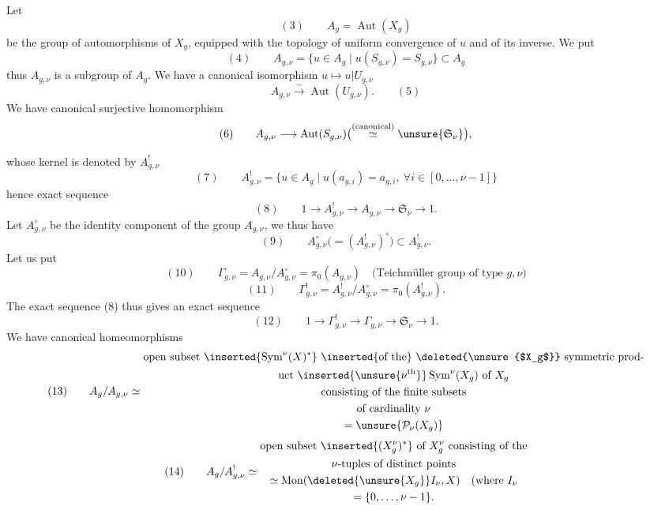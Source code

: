 Let
\[
(3)\qquad A_g=\operatorname{Aut}(X_g)
\]
be the group of automorphisms of $X_g$, equipped with the
topology of uniform convergence of $u$ and of its
inverse. We put
\[
(4)\qquad A_{g,\nu}=\{u\in A_g\mid u(S_{g,\nu})=S_{g,\nu}\}\subset A_g
\]
thus $A_{g,\nu}$ is a subgroup of $A_g$. We
have a canonical isomorphism $u\mapsto u|U_{g,\nu}$
\[
A_{g,\nu}\xrightarrow{\sim}\operatorname{Aut}(U_{g,\nu}).\qquad(5)
\]
 We have  canonical surjective homomorphism
\[
(6)\qquad A_{g,\nu}\longrightarrow\operatorname{Aut}(S_{g,\nu})
\bigl(\overset{\text{(canonical)}}{\simeq}\unsure{\mathfrak S_\nu}\bigr),
\]

whose kernel is denoted by $A_{g,\nu}^!$
\[
(7)\qquad A_{g,\nu}^!=\{u\in A_g\mid u(a_{g,i})=a_{g,i},\ \forall i\in[0,\ldots,\nu-1]\}
\]
hence exact sequence
\[
(8)\qquad 1\longrightarrow A_{g,\nu}^!\longrightarrow A_{g,\nu}
\longrightarrow\mathfrak S_\nu\longrightarrow1.
\]
Let $A_{g,\nu}^{\circ}$ be the identity component of the group
$A_{g,\nu}$, we thus have
\[
(9)\qquad A_{g,\nu}^{\circ}\bigl(=(A_{g,\nu}^!)^{\circ}\bigr)\subset A_{g,\nu}^!.
\]
Let us put
\[
(10)\qquad \Gamma_{g,\nu}=A_{g,\nu}/A_{g,\nu}^{\circ}=\pi_0(A_{g,\nu})
\quad\text{(Teichmüller group of type }g,\nu\text{)}
\]
\[
(11)\qquad \Gamma_{g,\nu}^!=A_{g,\nu}^!/A_{g,\nu}^{\circ}=\pi_0(A_{g,\nu}^!).
\]
The exact sequence (8) thus gives an exact
sequence
\[
(12)\qquad 1\longrightarrow\Gamma_{g,\nu}^!\longrightarrow\Gamma_{g,\nu}
\longrightarrow\mathfrak S_\nu\longrightarrow1.
\]
We have canonical homeomorphisms
\[
(13)\qquad A_g/A_{g,\nu}\simeq
\begin{gathered}
\text{open subset }\inserted{\operatorname{Sym}^{\nu}(X)^*}\text{ \inserted{of the} \deleted{\unsure{$X_g$}} symmetric prod-}\\
\text{uct }\inserted{\unsure{\nu^{\text{th}}}}\operatorname{Sym}^{\nu}(X_g)\text{ of }X_g\\
\text{consisting of the finite subsets}\\
\text{of cardinality }\nu\\
=\unsure{\mathcal P_\nu(X_g)}
\end{gathered}
\]
\[
(14)\qquad A_g/A_{g,\nu}^!\simeq
\begin{gathered}
\text{open subset }\inserted{(X_g^{\nu})^*}\text{ of }X_g^{\nu}\text{ consisting of the}\\
\nu\text{-tuples of distinct points}\\
\simeq\operatorname{Mon}(\deleted{\unsure{X_g}}I_\nu,X)\quad\text{(where }I_\nu\\
=\{0,\ldots,\nu-1\}.
\end{gathered}
\]

